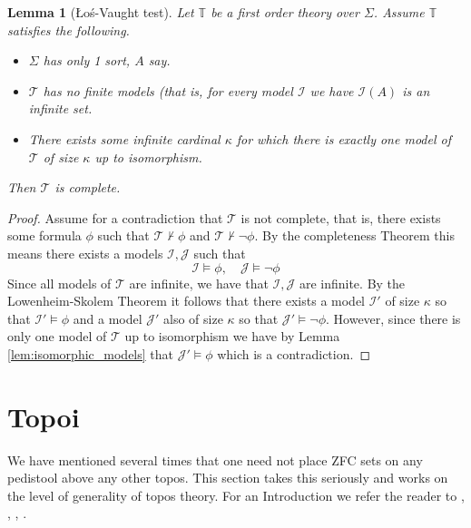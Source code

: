 \documentclass[12pt]{article}
\theoremstyle{plain}
\newtheorem{lemma}[thm]{Lemma}
\theoremstyle{definition}
\newcommand{\bb}[1]{\mathbb{#1}}
\newcommand{\call}[1]{\mathcal{#1}}
\begin{document}
	\begin{lemma}[\L o\'{s}-Vaught test]
		Let $\bb{T}$ be a first order theory over $\Sigma$. Assume $\bb{T}$ satisfies the following.
		\begin{itemize}
			\item $\Sigma$ has only 1 sort, $A$ say.
			\item $\call{T}$ has no finite models (that is, for every model $\call{I}$ we have $\call{I}(A)$ is an infinite set.
			\item There exists some infinite cardinal $\kappa$ for which there is exactly one model of $\call{T}$ of size $\kappa$ up to isomorphism.
			\end{itemize}
		Then $\call{T}$ is complete.
		\end{lemma}
	\begin{proof}
		Assume for a contradiction that $\call{T}$ is not complete, that is, there exists some formula $\phi$ such that $\call{T} \not\vdash \phi$ and $\call{T} \not\vdash \neg \phi$. By the completeness Theorem this means there exists a models $\call{I}, \call{J}$ such that
		\begin{equation}
			\call{I} \models \phi,\quad \call{J} \models \neg \phi
			\end{equation}
		Since all models of $\call{T}$ are infinite, we have that $\call{I}, \call{J}$ are infinite. By the Lowenheim-Skolem Theorem it follows that there exists a model $\call{I}'$ of size $\kappa$ so that $\call{I}' \models \phi$ and a model $\call{J}'$ also of size $\kappa$ so that $\call{J}' \models \neg \phi$. However, since there is only one model of $\call{T}$ up to isomorphism we have by Lemma \ref{lem:isomorphic_models} that $\call{J}' \models \phi$ which is a contradiction.
		\end{proof}
	
	
	
	
	
	
	\section{Topoi}
	We have mentioned several times that one need not place ZFC sets on any pedistool above any other topos. This section takes this seriously and works on the level of generality of topos theory. For an Introduction we refer the reader to \cite{TroianiThesis}, \cite{TroianiColimits}, \cite{Johnstone}, \cite{MM}.
	
\end{document}
